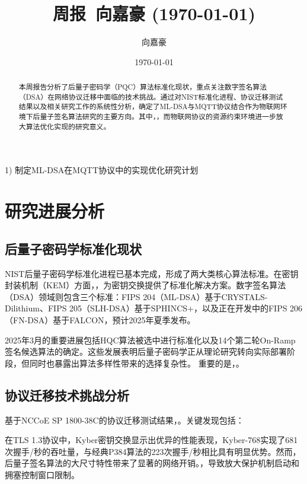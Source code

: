 \documentclass{article}
\title{周报~向嘉豪 (\today)}
\author{向嘉豪}
\date{\today}
\begin{document}
\maketitle

\begin{abstract}
本周报告分析了后量子密码学（PQC）算法标准化现状，重点关注数字签名算法（DSA）在网络协议迁移中面临的技术挑战。通过对NIST标准化进程、协议迁移测试结果以及相关研究工作的系统性分析，确定了ML-DSA与MQTT协议结合作为物联网环境下后量子签名算法研究的主要方向。其中，，而物联网协议的资源约束环境进一步放大算法优化实现的研究意义。
\end{abstract}

\begin{weekplan}
1) 制定ML-DSA在MQTT协议中的实现优化研究计划
\end{weekplan}

\section{研究进展分析}

\subsection{后量子密码学标准化现状}

NIST后量子密码学标准化进程已基本完成，形成了两大类核心算法标准。在密钥封装机制（KEM）方面，，为密钥交换提供了标准化解决方案。数字签名算法（DSA）领域则包含三个标准：FIPS 204（ML-DSA）基于CRYSTALS-Dilithium、FIPS 205（SLH-DSA）基于SPHINCS+，以及正在开发中的FIPS 206（FN-DSA）基于FALCON，预计2025年夏季发布。

2025年3月的重要进展包括HQC算法被选中进行标准化以及14个第二轮On-Ramp签名候选算法的确定。这些发展表明后量子密码学正从理论研究转向实际部署阶段，但同时也暴露出算法多样性带来的选择复杂性。
重要的是，。

\subsection{协议迁移技术挑战分析}

基于NCCoE SP 1800-38C的协议迁移测试结果，。关键发现包括：

在TLS 1.3协议中，Kyber密钥交换显示出优异的性能表现，Kyber-768实现了681次握手/秒的吞吐量，与经典P384算法的223次握手/秒相比具有明显优势。然而，后量子签名算法的大尺寸特性带来了显著的网络开销。，导致放大保护机制启动和拥塞控制窗口限制。
\end{document}
